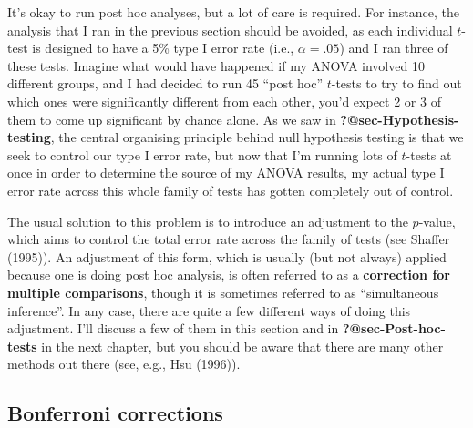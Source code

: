 \documentclass[
  a4paper,
]{book}
\begin{document}
It's okay to run post hoc analyses, but a lot of care is required. For
instance, the analysis that I ran in the previous section should be
avoided, as each individual \(t\)-test is designed to have a 5\% type I
error rate (i.e., \(\alpha = .05\)) and I ran three of these tests.
Imagine what would have happened if my ANOVA involved 10 different
groups, and I had decided to run 45 ``post hoc'' \(t\)-tests to try to
find out which ones were significantly different from each other, you'd
expect 2 or 3 of them to come up significant by chance alone. As we saw
in \textbf{?@sec-Hypothesis-testing}, the central organising principle
behind null hypothesis testing is that we seek to control our type I
error rate, but now that I'm running lots of \(t\)-tests at once in
order to determine the source of my ANOVA results, my actual type I
error rate across this whole family of tests has gotten completely out
of control.

The usual solution to this problem is to introduce an adjustment to the
\(p\)-value, which aims to control the total error rate across the
family of tests (see Shaffer (1995)). An adjustment of this form, which
is usually (but not always) applied because one is doing post hoc
analysis, is often referred to as a \textbf{correction for multiple
comparisons}, though it is sometimes referred to as ``simultaneous
inference''. In any case, there are quite a few different ways of doing
this adjustment. I'll discuss a few of them in this section and in
\textbf{?@sec-Post-hoc-tests} in the next chapter, but you should be
aware that there are many other methods out there (see, e.g., Hsu
(1996)).

\hypertarget{bonferroni-corrections}{%
\subsection{Bonferroni corrections}\label{bonferroni-corrections}}
\end{document}
